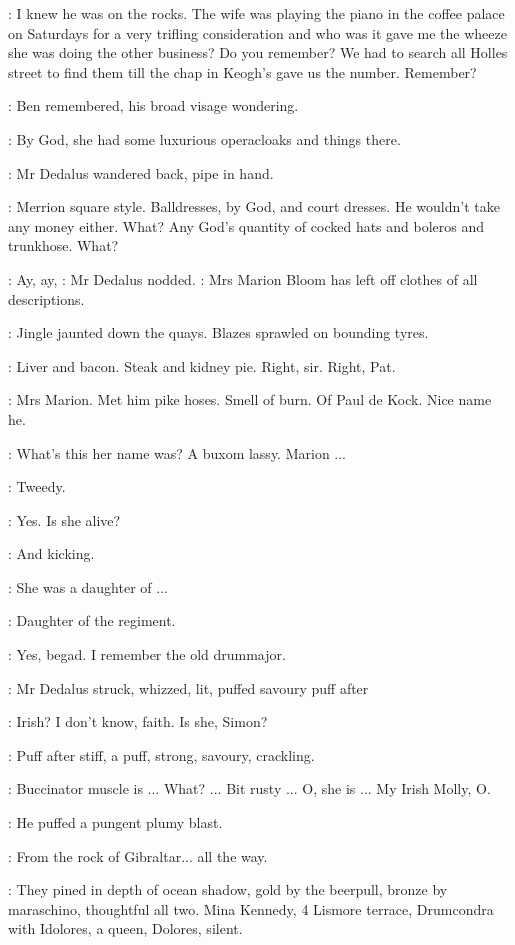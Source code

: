 \cowley:
I knew he was on the rocks.
The wife was playing the piano in
the coffee palace on Saturdays for a very trifling consideration and who
was it gave me the wheeze she was doing the other business?
Do you
remember?
We had to search all Holles street to find them till the chap in
Keogh's gave us the number.
Remember?

:
Ben remembered,
his broad visage wondering.

\dollard:
By God,
she had some luxurious operacloaks
and things there.

:
Mr Dedalus wandered back,
pipe in hand.

\dollard:
Merrion square style.
Balldresses,
by God,
and court dresses.
He
wouldn't take any money either.
What?
Any God's quantity of cocked hats
and boleros and trunkhose.
What?

\simon:
Ay,
ay,
:
Mr Dedalus nodded.
\simon:
Mrs Marion Bloom has left off clothes of all descriptions.

:
Jingle jaunted down the quays.
Blazes sprawled on bounding tyres.

\BloomInt:
Liver and bacon.
Steak and kidney pie.
Right,
sir.
Right,
Pat.

\BloomInt:
Mrs Marion.
Met him pike hoses.
Smell of burn.
Of Paul de Kock.
Nice name he.

\dollard:
What's this her name was?
A buxom lassy.
Marion ...

\simon:
Tweedy.

\dollard:
Yes.
Is she alive?

\simon:
And kicking.

\dollard:
She was a daughter of ...

\simon:
Daughter of the regiment.

\dollard:
Yes,
begad.
I remember the old drummajor.

:
Mr Dedalus struck,
whizzed,
lit,
puffed savoury puff after

\dollard:
Irish?
I don't know,
faith.
Is she,
Simon?

:
Puff after stiff,
a puff,
strong,
savoury,
crackling.

\simon:
Buccinator muscle is ...
What?
...
Bit rusty ...
O,
she is ...
My
Irish Molly,
O.

:
He puffed a pungent plumy blast.

\simon:
From the rock of Gibraltar...
all the way.

:
They pined in depth of ocean shadow,
gold by the beerpull,
bronze by
maraschino,
thoughtful all two.
Mina Kennedy,
4 Lismore terrace,
Drumcondra with Idolores,
a queen,
Dolores,
silent.

